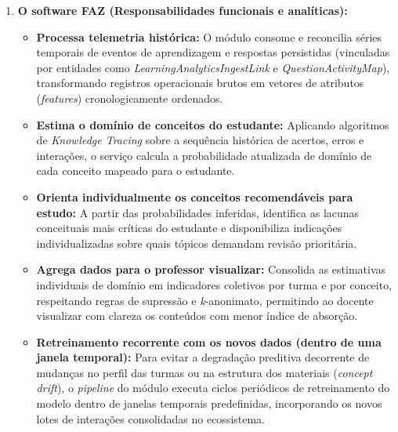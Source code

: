 \begin{enumerate}
    \item \textbf{O software FAZ (Responsabilidades funcionais e analíticas):}
    \begin{itemize}
        \item \textbf{Processa telemetria histórica:} O módulo consome e reconcilia séries temporais de eventos de aprendizagem e respostas persistidas (vinculadas por entidades como \textit{LearningAnalyticsIngestLink} e \textit{QuestionActivityMap}), transformando registros operacionais brutos em vetores de atributos (\textit{features}) cronologicamente ordenados.
        \item \textbf{Estima o domínio de conceitos do estudante:} Aplicando algoritmos de \textit{Knowledge Tracing} sobre a sequência histórica de acertos, erros e interações, o serviço calcula a probabilidade atualizada de domínio de cada conceito mapeado para o estudante.
        \item \textbf{Orienta individualmente os conceitos recomendáveis para estudo:} A partir das probabilidades inferidas, identifica as lacunas conceituais mais críticas do estudante e disponibiliza indicações individualizadas sobre quais tópicos demandam revisão prioritária.
        \item \textbf{Agrega dados para o professor visualizar:} Consolida as estimativas individuais de domínio em indicadores coletivos por turma e por conceito, respeitando regras de supressão e \textit{k}-anonimato, permitindo ao docente visualizar com clareza os conteúdos com menor índice de absorção.
        \item \textbf{Retreinamento recorrente com os novos dados (dentro de uma janela temporal):} Para evitar a degradação preditiva decorrente de mudanças no perfil das turmas ou na estrutura dos materiais (\textit{concept drift}), o \textit{pipeline} do módulo executa ciclos periódicos de retreinamento do modelo dentro de janelas temporais predefinidas, incorporando os novos lotes de interações consolidadas no ecossistema.
    \end{itemize}


\end{enumerate}
